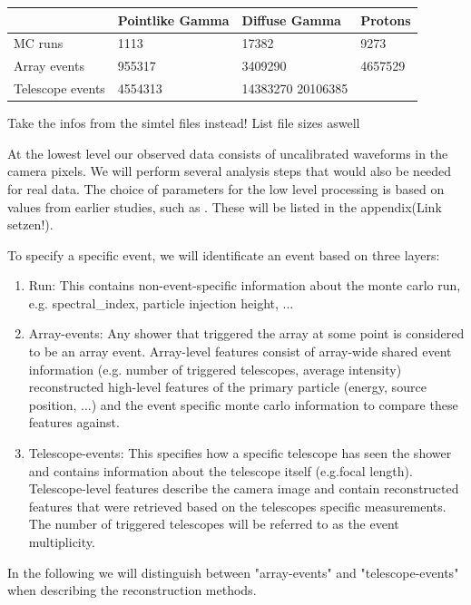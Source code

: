 \begin{center}
    \begin{tabular}{| l | l | l | l |}
    \hline
     & Pointlike Gamma & Diffuse Gamma & Protons \\
    \hline
    MC runs & \num{1113} & \num{17382} &  \num{9273} \\ 
    \hline
    Array events & \num{955317} & \num{3409290} & \num{4657529} \\
    \hline
    Telescope events & \num{4554313} & \num{14383270} \num{20106385} & 
    \end{tabular}
    \caption{Take the infos from the simtel files instead! List file sizes aswell}
    \label{tab:mc_infos}
\end{center}

At the lowest level our observed data consists of uncalibrated waveforms 
in the camera pixels.
We will perform several analysis steps that would also be needed for real data.
The choice of parameters for the low level processing 
is based on values from earlier studies, such as \cite{kai_diss}.
These will be listed in the appendix(Link setzen!).

To specify a specific event, we will identificate an event based on 
three layers:
\begin{enumerate}
    \item{Run: This contains non-event-specific information about the monte carlo run, e.g.
    spectral\_index, particle injection height, ...}
    \item{Array-events: Any shower that triggered the array at some point 
    is considered to be an array event.
    Array-level features consist of array-wide shared event information 
    (e.g. number of triggered telescopes, average intensity)
    reconstructed high-level features of the primary particle (energy, source position, ...) and the 
    event specific monte carlo information to compare these features against.}
    \item{Telescope-events: This specifies how a specific telescope has seen the shower and
    contains information about the telescope itself (e.g.focal length). Telescope-level features 
    describe the camera image and contain reconstructed features that were retrieved based on 
    the telescopes specific measurements. The number of triggered telescopes will be referred
    to as the event multiplicity.}
\end{enumerate}
In the following we will 
distinguish between "array-events" and "telescope-events" when describing the reconstruction methods.

